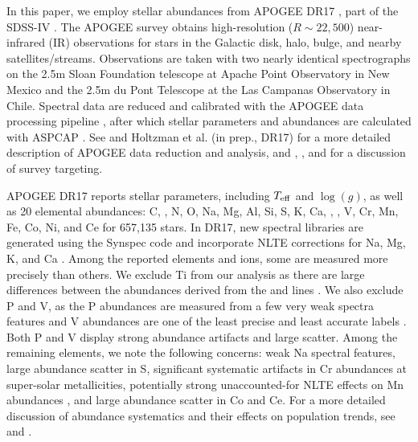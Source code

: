 \documentclass[modern]{aastex631}
\newcommand{\logg}{\log(g)}
\newcommand{\teff}{T_{\rm eff}}
\begin{document}
In this paper, we employ stellar abundances from APOGEE DR17 \citep{abdurrouf2022}, part of the SDSS-IV \citep{majewski2017}. The APOGEE survey obtains high-resolution ($R\sim22,500$) near-infrared (IR) observations \citep{wilson2019} for stars in the Galactic disk, halo, bulge, and nearby satellites/streams. Observations are taken with two nearly identical spectrographs on the 2.5m Sloan Foundation telescope \citep{wilson2019} at Apache Point Observatory in New Mexico and the 2.5m du Pont Telescope \citep{bowen1973} at the Las Campanas Observatory in Chile. Spectral data are reduced and calibrated with the APOGEE data processing pipeline \citep{nidever2015}, after which stellar parameters and abundances are calculated with ASPCAP \citep[APOGEE Stellar Parameter and Chemical Abundance Pipeline;][]{holtzman2015, garcia2016}. See \citet[][DR16]{jonsson2020} and Holtzman et al. (in prep., DR17) for a more detailed description of APOGEE data reduction and analysis, and \citet{zasowski2013, zasowski2017}, \citet{beaton2021}, and \citet{santana2021} for a discussion of survey targeting.

APOGEE DR17 reports stellar parameters, including $\teff$ and $\logg$, as well as 20 elemental abundances: C, , N, O, Na, Mg, Al, Si, S, K, Ca, , , V, Cr, Mn, Fe, Co, Ni, and Ce for 657,135 stars. In DR17, new spectral libraries \citep{hubeny2021} are generated using the Synspec code and incorporate NLTE corrections for Na, Mg, K, and Ca \citep{osorio2020}. Among the reported elements and ions, some are measured more precisely than others. We exclude Ti from our analysis as there are large differences between the abundances derived from the  and  lines \citep{jonsson2020}. We also exclude P and V, as the P abundances are measured from a few very weak spectra features and V abundances are one of the least precise and least accurate labels \citep{jonsson2020}. Both P and V display strong abundance artifacts and large scatter. Among the remaining elements, we note the following concerns: weak Na spectral features, large abundance scatter in S, significant systematic artifacts in Cr abundances at super-solar metallicities, potentially strong unaccounted-for NLTE effects on Mn abundances \citep{bergemann2019}, and large abundance scatter in Co and Ce. For a more detailed discussion of abundance systematics and their effects on population trends, see \citet{jonsson2020} and \citet{griffith2021a}.
\end{document}
